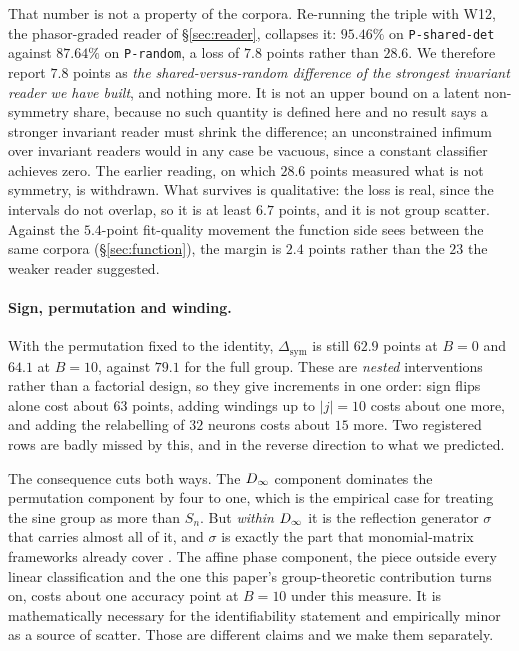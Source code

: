 That number is not a property of the corpora. Re-running the triple with W12, the phasor-graded
reader of \S\ref{sec:reader}, collapses it: $95.46\%$ on \texttt{P-shared-det} against $87.64\%$ on
\texttt{P-random}, a loss of $7.8$ points rather than $28.6$. We therefore report $7.8$ points as
\emph{the shared-versus-random difference of the strongest invariant reader we have built}, and
nothing more. It is not an upper bound on a latent non-symmetry share, because no such quantity is
defined here and no result says a stronger invariant reader must shrink the difference; an
unconstrained infimum over invariant readers would in any case be vacuous, since a constant
classifier achieves zero. The earlier reading, on which $28.6$ points measured what is not symmetry,
is withdrawn. What survives is qualitative: the loss is real, since the intervals do not overlap, so
it is at least $6.7$ points, and it is not group scatter. Against the $5.4$-point fit-quality
movement the function side sees between the same corpora (\S\ref{sec:function}), the margin is
$2.4$ points rather than the $23$ the weaker reader suggested.

\paragraph{Sign, permutation and winding.} With the permutation fixed to the identity,
$\Delta_{\mathrm{sym}}$ is still $62.9$ points at $B=0$ and $64.1$ at $B=10$, against $79.1$ for the
full group. These are \emph{nested} interventions rather than a factorial design, so they give
increments in one order: sign flips alone cost about $63$ points, adding windings up to $|j|=10$
costs about one more, and adding the relabelling of $32$ neurons costs about $15$ more. Two
registered rows are badly missed by this, and in the reverse direction to what we predicted.

The consequence cuts both ways. The $D_\infty$ component dominates the permutation component by four
to one, which is the empirical case for treating the sine group as more than $S_n$. But
\emph{within} $D_\infty$ it is the reflection generator $\sigma$ that carries almost all of it, and
$\sigma$ is exactly the part that monomial-matrix frameworks already cover
\citep{tran2024monomial}. The affine phase component, the piece outside every linear classification
and the one this paper's group-theoretic contribution turns on, costs about one accuracy point at
$B=10$ under this measure. It is mathematically necessary for the identifiability statement and
empirically minor as a source of scatter. Those are different claims and we make them separately.
